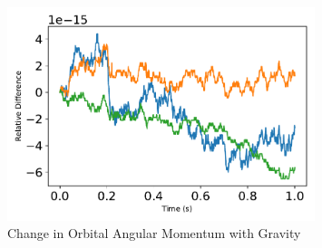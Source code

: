 \begin{figure}[htbp]\centerline{\includegraphics[width=0.8\textwidth]{AutoTeX/ChangeInOrbitalAngularMomentum1}}\caption{Change in Orbital Angular Momentum with Gravity}\label{fig:ChangeInOrbitalAngularMomentum1}\end{figure}